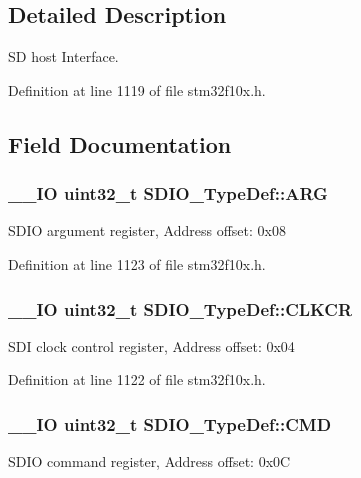 \subsection{Detailed Description}
S\-D host Interface. 

Definition at line 1119 of file stm32f10x.\-h.



\subsection{Field Documentation}
\hypertarget{struct_s_d_i_o___type_def_a3e24392875e98cd09043e54a0990ab7a}{
\subsubsection[{A\-R\-G}]{\setlength{\rightskip}{0pt plus 5cm}\-\_\-\-\_\-\-I\-O {\bf uint32\-\_\-t} S\-D\-I\-O\-\_\-\-Type\-Def\-::\-A\-R\-G}}\label{struct_s_d_i_o___type_def_a3e24392875e98cd09043e54a0990ab7a}
S\-D\-I\-O argument register, Address offset\-: 0x08 

Definition at line 1123 of file stm32f10x.\-h.

\hypertarget{struct_s_d_i_o___type_def_aeb1e30ce2038628e45264f75e5e926bb}{
\subsubsection[{C\-L\-K\-C\-R}]{\setlength{\rightskip}{0pt plus 5cm}\-\_\-\-\_\-\-I\-O {\bf uint32\-\_\-t} S\-D\-I\-O\-\_\-\-Type\-Def\-::\-C\-L\-K\-C\-R}}\label{struct_s_d_i_o___type_def_aeb1e30ce2038628e45264f75e5e926bb}
S\-D\-I clock control register, Address offset\-: 0x04 

Definition at line 1122 of file stm32f10x.\-h.

\hypertarget{struct_s_d_i_o___type_def_abbbdc3174e12dab21123d746d65f345d}{
\subsubsection[{C\-M\-D}]{\setlength{\rightskip}{0pt plus 5cm}\-\_\-\-\_\-\-I\-O {\bf uint32\-\_\-t} S\-D\-I\-O\-\_\-\-Type\-Def\-::\-C\-M\-D}}\label{struct_s_d_i_o___type_def_abbbdc3174e12dab21123d746d65f345d}
S\-D\-I\-O command register, Address offset\-: 0x0\-C 

